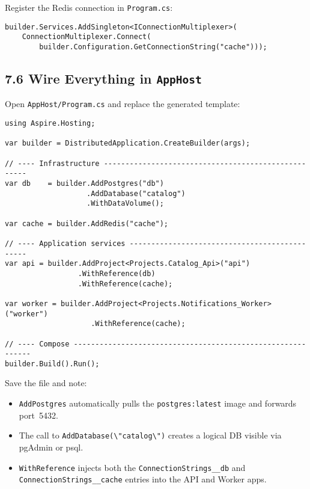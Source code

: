 \documentclass[table]{article}
\begin{document}
Register the Redis connection in \verb|Program.cs|:

\begin{verbatim}
builder.Services.AddSingleton<IConnectionMultiplexer>(
    ConnectionMultiplexer.Connect(
        builder.Configuration.GetConnectionString("cache")));
\end{verbatim}

\subsection*{7.6 \faCogs\enspace Wire Everything in \texttt{AppHost}}
Open \verb|AppHost/Program.cs| and replace the generated template:

\begin{verbatim}
using Aspire.Hosting;

var builder = DistributedApplication.CreateBuilder(args);

// ---- Infrastructure ----------------------------------------------------
var db    = builder.AddPostgres("db")
                   .AddDatabase("catalog")
                   .WithDataVolume();

var cache = builder.AddRedis("cache");

// ---- Application services ----------------------------------------------
var api = builder.AddProject<Projects.Catalog_Api>("api")
                 .WithReference(db)
                 .WithReference(cache);

var worker = builder.AddProject<Projects.Notifications_Worker>("worker")
                    .WithReference(cache);

// ---- Compose ------------------------------------------------------------
builder.Build().Run();
\end{verbatim}

\noindent
Save the file and note:

\begin{itemize}
  \item \verb|AddPostgres| automatically pulls the
    \texttt{postgres:latest} image and forwards port~5432.
  \item The call to \verb|AddDatabase(\"catalog\")| creates a logical DB
    visible via pgAdmin or psql.
  \item \verb|WithReference| injects both the \verb|ConnectionStrings__db|
    and \verb|ConnectionStrings__cache| entries into the API and Worker apps.
\end{itemize}
\end{document}
